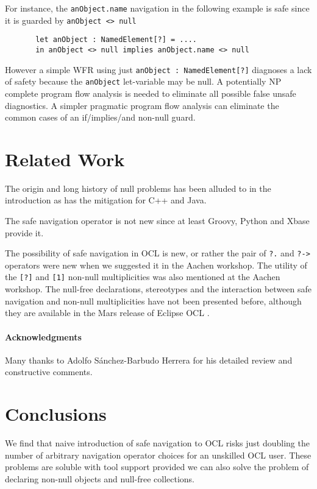\documentclass{llncs}
\begin{document}
For instance, the \verb$anObject.name$ navigation in the following example is safe since it is guarded by \verb$anObject <> null$

\begin{verbatim}
       let anObject : NamedElement[?] = .... 
       in anObject <> null implies anObject.name <> null
\end{verbatim}

However a simple WFR using just \verb$anObject : NamedElement[?]$ diagnoses a lack of safety because the \verb$anObject$ let-variable may be null. A potentially NP complete program flow analysis is needed to eliminate all possible false unsafe diagnostics. A simpler pragmatic program flow analysis can eliminate the common cases of an if/implies/and non-null guard.

\section{Related Work}\label{Related Work}

The origin and long history of null problems has been alluded to in the introduction as has the mitigation for C++ and Java.

The safe navigation operator is not new since at least Groovy, Python and Xbase provide it.

The possibility of safe navigation in OCL is new, or rather the pair of \verb$?.$ and \verb$?->$ operators were new when we suggested it in the Aachen workshop\cite{aachen}. The utility of the \verb$[?]$ and \verb$[1]$ non-null multiplicities was also mentioned at the Aachen workshop. The null-free declarations, stereotypes and the interaction between safe navigation and non-null multiplicities have not been presented before, although they are available in the Mars release of Eclipse OCL \cite{Mars-OCL}. 

\paragraph{Acknowledgments}

Many thanks to Adolfo S\'{a}nchez-Barbudo Herrera for his detailed review and constructive comments.
%
\section{Conclusions}\label{Conclusions}
%
We find that naive introduction of safe navigation to OCL risks just doubling the number of arbitrary navigation operator choices for an unskilled OCL user. These problems are soluble with tool support provided we can also solve the problem of declaring non-null objects and null-free collections.
\end{document}
